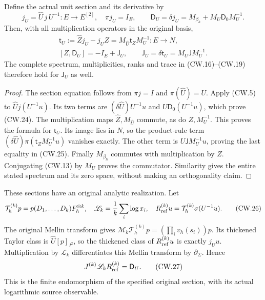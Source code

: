 \begin{theorem}
Define the actual unit section and its derivative by
\[
 j_U=\widehat U\,j\,U^{-1}:E\to E^{[2]},\quad
 \pi j_U=I_E,\qquad
 \mathsf D_U=\delta j_U
            =M_{\beta_h}+M_U\mathsf D_0M_U^{-1}.
 \tag{CW.24}
\]
Then, with all multiplication operators in the original basis,
\[
 \begin{gathered}
 \mathsf t_U:=\widehat Zj_U-j_UZ
                =M_{\widehat U}\mathsf t_ZM_U^{-1}:E\to N,\\
 [Z,\mathsf D_U]=-I_E+\mathsf J_U,\qquad
 \mathsf J_U=\delta\mathsf t_U=M_U\mathsf JM_U^{-1}.
 \end{gathered}                                                    \tag{CW.25}
\]
The complete spectrum, multiplicities, ranks and trace in
(CW.16)--(CW.19) therefore hold for \(\mathsf J_U\) as well.
\end{theorem}
\begin{proof}
The section equation follows from \(\pi j=I\) and
\(\pi(\widehat U)=U\).
Apply (CW.5) to \(\widehat Uj(U^{-1}u)\).
Its two terms are
\((\delta\widehat U)U^{-1}u\) and \(U\mathsf D_0(U^{-1}u)\),
which prove (CW.24).
The multiplication maps \(\widehat Z,M_{\widehat U}\)
commute, as do \(Z,M_U^{-1}\).  This proves the formula
for \(\mathsf t_U\).
Its image lies in \(N\), so the product-rule term
\((\delta\widehat U)\pi(\mathsf t_ZM_U^{-1}u)\) vanishes
exactly.  The other term is \(U\mathsf JM_U^{-1}u\),
proving the last equality in (CW.25).
Finally \(M_{\beta_h}\) commutes with multiplication by \(Z\).
Conjugating (CW.13) by \(M_U\) proves the commutator.
Similarity gives the entire stated spectrum and its zero
space, without making an orthogonality claim.
\end{proof}

These sections have an original analytic realization.
Let
\[
 \mathcal T_h^{(k)}p=p(D_1,\ldots,D_k)F_h^{\otimes k},
 \quad
 \mathscr L_k=\frac1k\sum_i\log x_i,\quad
 R_{\rm ref}^{(k)}u=\mathcal T_h^{(k)}\sigma(U^{-1}u).
 \tag{CW.26}
\]
The original Mellin transform gives
\(\mathcal M_k\mathcal T_h^{(k)}p=(\prod_i v_h(s_i))p\).
Its thickened Taylor class is
\(\widehat U[p]_{I^2}\), so the thickened class of
\(R_{\rm ref}^{(k)}u\) is exactly \(j_Uu\).
Multiplication by \(\mathscr L_k\) differentiates this Mellin
transform by \(\partial_\Sigma\).  Hence
\[
 J^{(k)}\mathscr L_kR_{\rm ref}^{(k)}=\mathsf D_U .
 \tag{CW.27}
\]
This is the finite endomorphism of the specified original
section, with its actual logarithmic source observable.

